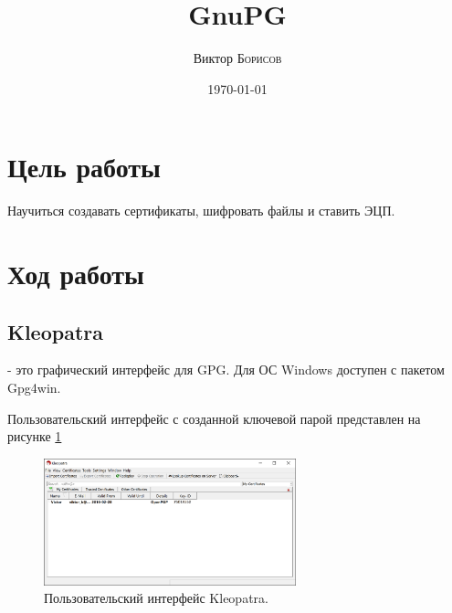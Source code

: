\documentclass[10pt,a4paper]{article}
\title{GnuPG} %
\author{Виктор \textsc{Борисов}} %
\date{\today} %
\begin{document}
\maketitle %

\newpage

\tableofcontents

\newpage


\section{Цель работы}

Научиться создавать сертификаты, шифровать файлы и ставить ЭЦП.
 

\section{Ход работы}

\subsection{Kleopatra}
\label{kleopatra}

- это графический интерфейс для GPG. Для ОС Windows доступен с пакетом Gpg4win.

Пользовательский интерфейс с созданной ключевой парой представлен на рисунке \ref{fig:kleopatra_gui}


\begin{figure}[h]
\begin{center}
\includegraphics[width=0.65\textwidth]{kleopatra_gui} %
\caption{Пользовательский интерфейс Kleopatra.}
\label{fig:kleopatra_gui}
\end{center}
\end{figure}
\end{document}

